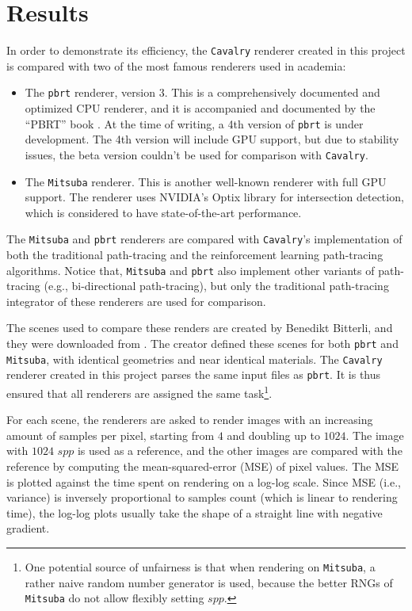 \chapter{Results}

In order to demonstrate its efficiency, the \texttt{Cavalry} renderer created in this project is compared with two of the most famous renderers used in academia:

\begin{itemize}
    \item The \texttt{pbrt} renderer, version 3. This is a comprehensively documented and optimized CPU renderer, and it is accompanied and documented by the ``PBRT'' book \cite{pharr2016physically}. At the time of writing, a 4th version of \texttt{pbrt} is under development. The 4th version will include GPU support, but due to stability issues, the beta version couldn't be used for comparison with \texttt{Cavalry}.
    
    \item The \texttt{Mitsuba} renderer. This is another well-known renderer with full GPU support. The renderer uses NVIDIA's Optix library for intersection detection, which is considered to have state-of-the-art performance.  
\end{itemize}

The \texttt{Mitsuba} and \texttt{pbrt} renderers are compared with \texttt{Cavalry}'s implementation of both the traditional path-tracing and the reinforcement learning path-tracing algorithms. Notice that, \texttt{Mitsuba} and \texttt{pbrt} also implement other variants of path-tracing (e.g., bi-directional path-tracing), but only the traditional path-tracing integrator of these renderers are used for comparison.

The scenes used to compare these renders are created by Benedikt Bitterli, and they were downloaded from \cite{resources16}. The creator defined these scenes for both \texttt{pbrt} and \texttt{Mitsuba}, with identical geometries and near identical materials. The \texttt{Cavalry} renderer created in this project parses the same input files as \texttt{pbrt}. It is thus ensured that all renderers are assigned the same task\footnote{One potential source of unfairness is that when rendering on \texttt{Mitsuba}, a rather naive random number generator is used, because the better RNGs of \texttt{Mitsuba} do not allow flexibly setting $spp$.}.

For each scene, the renderers are asked to render images with an increasing amount of samples per pixel, starting from $4$ and doubling up to $1024$. The image with $1024$ $spp$ is used as a reference, and the other images are compared with the reference by computing the mean-squared-error (MSE) of pixel values. The MSE is plotted against the time spent on rendering on a log-log scale. Since MSE (i.e., variance) is inversely proportional to samples count (which is linear to rendering time), the log-log plots usually take the shape of a straight line with negative gradient.

